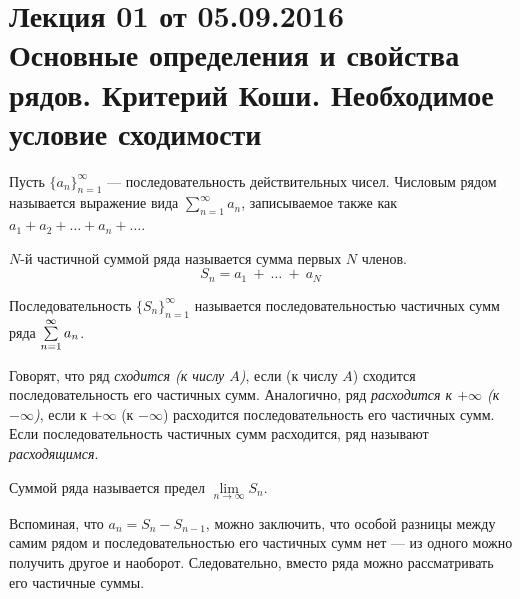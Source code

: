 \section{Лекция 01 от 05.09.2016 \\ Основные определения и свойства рядов. Критерий Коши. Необходимое условие сходимости}
\begin{Def}
	Пусть \(\{a_n\}^{\infty}_{n=1}\) --- последовательность действительных чисел. Числовым рядом называется выражение вида \(\sum\limits_{n=1}^{\infty}a_n\), записываемое также как \(a_1 + a_2 + \ldots + a_n + \ldots \).
	
\end{Def}
\begin{Def}
	\(N\)-й частичной суммой ряда называется сумма первых \(N\) членов. 
	$$S_n = a_1~+~\ldots~+~a_N$$
\end{Def}

\begin{Def}
	Последовательность \(\{S_n\}^{\infty}_{n=1}\)
	называется последовательностью частичных сумм ряда $\sum\limits_{n=1}^{\infty}a_n$.
\end{Def}

Говорят, что ряд \textit{сходится (к числу $A$)}, если (к числу $A$) сходится последовательность его частичных сумм. Аналогично, ряд \textit{расходится к $+\infty$ (к $-\infty$)}, если к $+\infty$ (к $-\infty$) расходится последовательность его частичных сумм. Если последовательность частичных сумм расходится, ряд называют \textit{расходящимся}.

\begin{Def}
Суммой ряда называется предел $\lim\limits_{n \to \infty} S_n$.
\end{Def}
Вспоминая, что $a_n = S_{n} - S_{n-1}$, можно заключить, что особой разницы между самим рядом и последовательностью его частичных сумм нет --- из одного можно получить другое и наоборот. Следовательно, вместо ряда можно рассматривать его частичные суммы.

